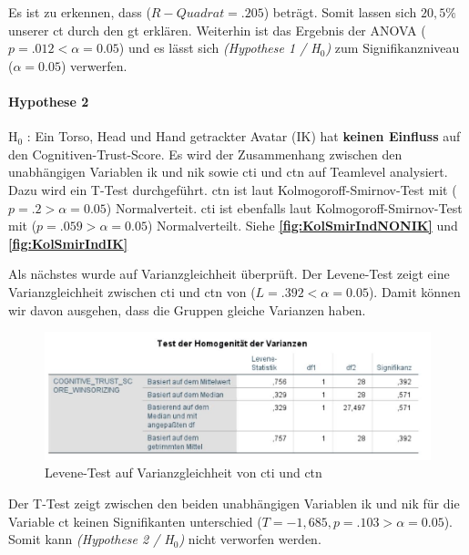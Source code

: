 \documentclass[a4paper,11pt]{article}%
\renewcommand{\\}{\vspace*{0.5\baselineskip} \newline}
\begin{document}
Es ist zu erkennen, dass ($R-Quadrat = .205$) beträgt. Somit lassen sich $20,5\%$ unserer \ac{ct} durch den \ac{gt} erklären. Weiterhin ist das Ergebnis der ANOVA ($p = .012 < \alpha = 0.05$) und es lässt sich \textit{(Hypothese 1 / H$_{0}$)} zum Signifikanzniveau ($\alpha = 0.05$) verwerfen.
\newpage
\paragraph{Hypothese 2}
H$_{0}$ : Ein Torso, Head und Hand getrackter Avatar (IK) hat \textbf{keinen Einfluss} auf den Cognitiven-Trust-Score.\\
Es wird der Zusammenhang zwischen den unabhängigen Variablen \ac{ik} und \ac{nik} sowie \ac{cti} und \ac{ctn} auf Teamlevel analysiert. Dazu wird ein T-Test durchgeführt.
\ac{ctn} ist laut Kolmogoroff-Smirnov-Test mit ($p = .2 > \alpha = 0.05$) Normalverteit. \ac{cti} ist ebenfalls laut Kolmogoroff-Smirnov-Test mit ($p = .059 > \alpha = 0.05$) Normalverteilt. Siehe \textbf{\autoref{fig:KolSmirIndNONIK}} und \textbf{\autoref{fig:KolSmirIndIK}}

Als nächstes wurde auf Varianzgleichheit überprüft. Der Levene-Test zeigt eine Varianzgleichheit zwischen \ac{cti} und \ac{ctn} von ($L = .392 < \alpha = 0.05$). Damit können wir davon ausgehen, dass die Gruppen gleiche Varianzen haben.

\begin{figure}[H]
\centering
		\begin{footnotesize}
			\includegraphics[scale=0.8]{Abbildungen/Post_QuestionnaireStatistiks/Varianzgleichheit_Levene_cti_ctn}
			\caption{Levene-Test auf Varianzgleichheit von \ac{cti} und \ac{ctn}}
			\label{fig:Varianzgleichheit_Levene_gt_ct}
		\end{footnotesize}
	\end{figure}	


Der T-Test zeigt zwischen den beiden unabhängigen Variablen \ac{ik} und \ac{nik} für die Variable \ac{ct} keinen Signifikanten unterschied ($T = -1,685 , p = .103 > \alpha = 0.05$).  Somit kann \textit{(Hypothese 2 / H$_{0}$)} nicht verworfen werden.
\end{document}
